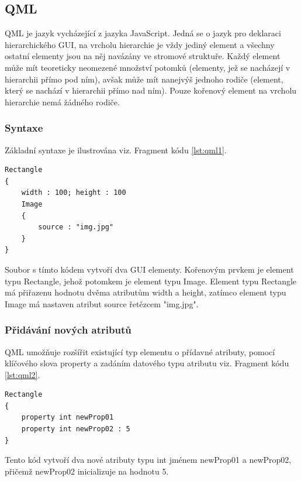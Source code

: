 \documentclass[report,11pt]{elsarticle}
\begin{document}
\subsection{QML}
QML je jazyk vycházející z jazyka JavaScript. Jedná se o jazyk pro deklaraci hierarchického GUI, na vrcholu hierarchie je vždy jediný element a všechny ostatní elementy jsou na něj navázány ve stromové struktuře. Každý element může mít teoreticky neomezené množství potomků (elementy, jež se nacházejí v hierarchii přímo pod ním), avšak může mít nanejvýš jednoho rodiče (element, který se nachází v hierarchii přímo nad ním). Pouze kořenový element na vrcholu hierarchie nemá žádného rodiče.


\subsubsection{Syntaxe}
Základní syntaxe je ilustrována viz. Fragment kódu \ref{lst:qml1}.
\begin{lstlisting}[frame=single,caption=Tvorba dvou jednoduchých elementů pomocí jazyka QML.,label=Tvorba dvou jednoduchých elementů pomocí jazyka QML.,label=lst:qml1]
Rectangle
{
	width : 100; height : 100
	Image
	{
		source : "img.jpg"
	}
}
\end{lstlisting}
Soubor s tímto kódem vytvoří dva GUI elementy. Kořenovým prvkem je element typu Rectangle, jehož potomkem je element typu Image. Element typu Rectangle má přiřazenu hodnotu dvěma atributům width a height, zatímco element typu Image má nastaven atribut source řetězcem "img.jpg".

\subsubsection{Přidávání nových atributů}
QML umožňuje rozšířit existující typ elementu o přídavné atributy, pomocí klíčového slova property a zadáním  datového typu atributu viz. Fragment kódu \ref{lst:qml2}.
\begin{lstlisting}[frame=single,caption=Ukázka deklarace dvou nových atributů.,label=lst:qml2]
Rectangle
{
	property int newProp01
	property int newProp02 : 5
}
\end{lstlisting}
Tento kód vytvoří dva nové atributy typu int jménem newProp01 a newProp02, přičemž newProp02 inicializuje na hodnotu 5.
\end{document}
